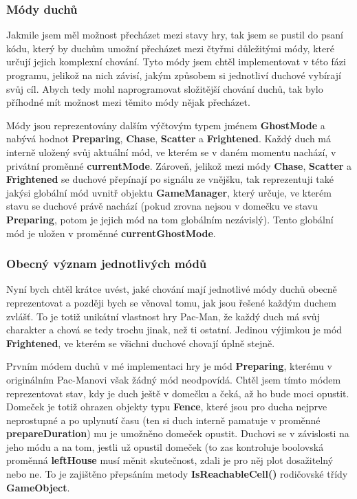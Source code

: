 \documentclass[a4]{article}
\begin{document}
\subsubsection{Módy duchů} \label{generalmodes}
Jakmile jsem měl možnost přecházet mezi stavy hry, tak jsem se pustil do psaní kódu, který by duchům umožní přecházet mezi čtyřmi důležitými módy, které určují jejich komplexní chování. Tyto módy jsem chtěl implementovat v této fázi programu, jelikož na nich závisí, jakým způsobem si jednotliví duchové vybírají svůj cíl. Abych tedy mohl naprogramovat složitější chování duchů, tak bylo příhodné mít možnost mezi těmito módy nějak přecházet.

Módy jsou reprezentovány dalším výčtovým typem jménem \textbf{GhostMode} a nabývá hodnot \textbf{Preparing}, \textbf{Chase}, \textbf{Scatter} a \textbf{Frightened}. Každý duch má interně uložený svůj aktuální mód, ve kterém se v daném momentu nachází, v privátní proměnné \textbf{currentMode}. Zároveň, jelikož mezi módy \textbf{Chase}, \textbf{Scatter} a \textbf{Frightened} se duchové přepínají po signálu ze vnějšku, tak reprezentuji také jakýsi globální mód uvnitř objektu \textbf{GameManager}, který určuje, ve kterém stavu se duchové právě nachází (pokud zrovna nejsou v domečku ve stavu \textbf{Preparing}, potom je jejich mód na tom globálním nezávislý). Tento globální mód je uložen v proměnné \textbf{currentGhostMode}.

\subsubsection{Obecný význam jednotlivých módů} \label{modemeaning}
Nyní bych chtěl krátce uvést, jaké chování mají jednotlivé módy duchů obecně reprezentovat a později bych se věnoval tomu, jak jsou řešené každým duchem zvlášť. To je totiž unikátní vlastnost hry Pac-Man, že každý duch má svůj charakter a chová se tedy trochu jinak, než ti ostatní. Jedinou výjimkou je mód \textbf{Frightened}, ve kterém se všichni duchové chovají úplně stejně.

Prvním módem duchů v mé implementaci hry je mód \textbf{Preparing}, kterému v originálním Pac-Manovi však žádný mód neodpovídá. Chtěl jsem tímto módem reprezentovat stav, kdy je duch ještě v domečku a čeká, až ho bude moci opustit. Domeček je totiž ohrazen objekty typu \textbf{Fence}, které jsou pro ducha nejprve neprostupné a po uplynutí času (ten si duch interně pamatuje v proměnné \textbf{prepareDuration}) mu je umožněno domeček opustit. Duchovi se v závislosti na jeho módu a na tom, jestli už opustil domeček (to zas kontroluje boolovská proměnná \textbf{leftHouse} musí měnit skutečnost, zdali je pro něj plot dosažitelný nebo ne. To je zajištěno přepsáním metody \textbf{IsReachableCell()} rodičovské třídy \textbf{GameObject}.
\end{document}
